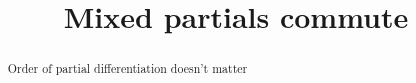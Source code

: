\documentclass{ximera}
\title{Mixed partials commute}
\begin{document}
	\begin{abstract}
		Order of partial differentiation doesn't matter
	\end{abstract}
	
	
\end{document}
